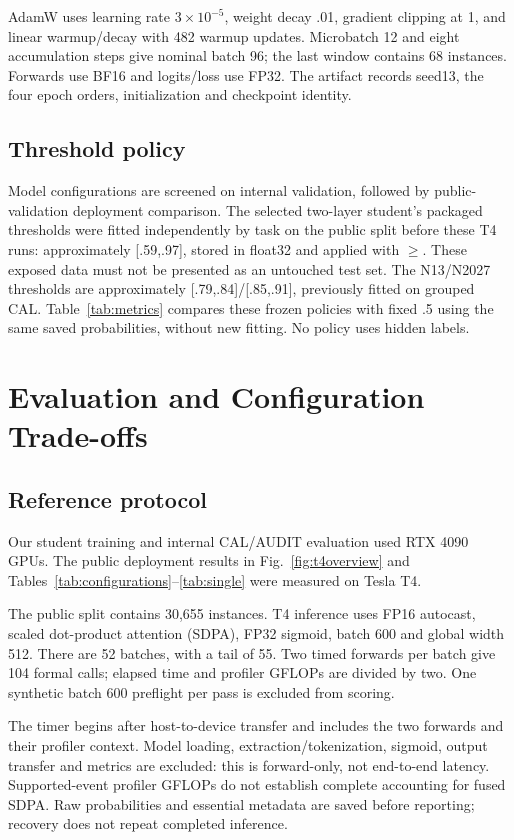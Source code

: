 \documentclass[10pt,conference]{IEEEtran}
\begin{document}
AdamW uses learning rate $3\times10^{-5}$, weight decay .01, gradient clipping at 1, and linear warmup/decay with 482 warmup updates. Microbatch 12 and eight accumulation steps give nominal batch 96; the last window contains 68 instances. Forwards use BF16 and logits/loss use FP32. The artifact records seed13, the four epoch orders, initialization and checkpoint identity.

\subsection{Threshold policy}
Model configurations are screened on internal validation, followed by public-validation deployment comparison. The selected two-layer student's packaged thresholds were fitted independently by task on the public split before these T4 runs: approximately [.59,.97], stored in float32 and applied with $\geq$. These exposed data must not be presented as an untouched test set. The N13/N2027 thresholds are approximately [.79,.84]/[.85,.91], previously fitted on grouped CAL. Table~\ref{tab:metrics} compares these frozen policies with fixed .5 using the same saved probabilities, without new fitting. No policy uses hidden labels.

\section{Evaluation and Configuration Trade-offs}
\subsection{Reference protocol}
Our student training and internal CAL/AUDIT evaluation used RTX 4090 GPUs. The public deployment results in Fig.~\ref{fig:t4overview} and Tables~\ref{tab:configurations}--\ref{tab:single} were measured on Tesla T4.

The public split contains 30,655 instances. T4 inference uses FP16 autocast, scaled dot-product attention (SDPA), FP32 sigmoid, batch 600 and global width 512. There are 52 batches, with a tail of 55. Two timed forwards per batch give 104 formal calls; elapsed time and profiler GFLOPs are divided by two. One synthetic batch 600 preflight per pass is excluded from scoring.

The timer begins after host-to-device transfer and includes the two forwards and their profiler context. Model loading, extraction/tokenization, sigmoid, output transfer and metrics are excluded: this is forward-only, not end-to-end latency. Supported-event profiler GFLOPs do not establish complete accounting for fused SDPA. Raw probabilities and essential metadata are saved before reporting; recovery does not repeat completed inference.
\end{document}

